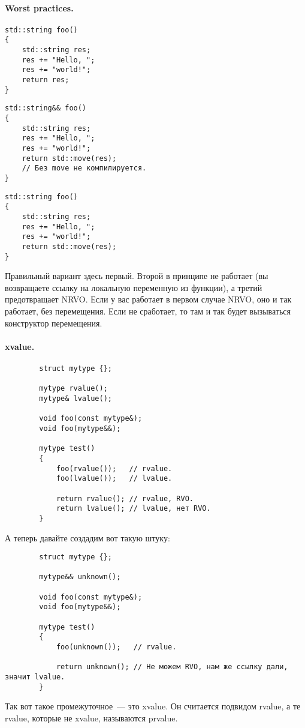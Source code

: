 \documentclass{article}
\begin{document}
    \paragraph{Worst practices.}\mbox{}
    \begin{multicols}{3}
        \begin{verbatim}
std::string foo()
{
    std::string res;
    res += "Hello, ";
    res += "world!";
    return res;
}
        \end{verbatim}
        \columnbreak
        \begin{verbatim}
std::string&& foo()
{
    std::string res;
    res += "Hello, ";
    res += "world!";
    return std::move(res);
    // Без move не компилируется.
}
        \end{verbatim}
        \columnbreak
        \begin{verbatim}
std::string foo()
{
    std::string res;
    res += "Hello, ";
    res += "world!";
    return std::move(res);
}
        \end{verbatim}
    \end{multicols}\noindent
    Правильный вариант здесь первый. Второй в принципе не работает (вы возвращаете ссылку на локальную переменную из функции), а третий предотвращает NRVO. Если у вас работает в первом случае NRVO, оно и так работает, без перемещения. Если не сработает, то там и так будет вызываться конструктор перемещения.
    \paragraph{xvalue.}
    \label{par:xvalue}
    \begin{verbatim}
        struct mytype {};
        
        mytype rvalue();
        mytype& lvalue();
        
        void foo(const mytype&);
        void foo(mytype&&);
        
        mytype test()
        {
            foo(rvalue());   // rvalue.
            foo(lvalue());   // lvalue.
            
            return rvalue(); // rvalue, RVO.
            return lvalue(); // lvalue, нет RVO.
        }
    \end{verbatim}
    А теперь давайте создадим вот такую штуку:
    \begin{verbatim}
        struct mytype {};
        
        mytype&& unknown();
        
        void foo(const mytype&);
        void foo(mytype&&);
        
        mytype test()
        {
            foo(unknown());   // rvalue.
            
            return unknown(); // Не можем RVO, нам же ссылку дали, значит lvalue.
        }
    \end{verbatim}
    Так вот такое промежуточное~--- это xvalue. Он считается подвидом rvalue, а те rvalue, которые не xvalue, называются prvalue.
\end{document}

